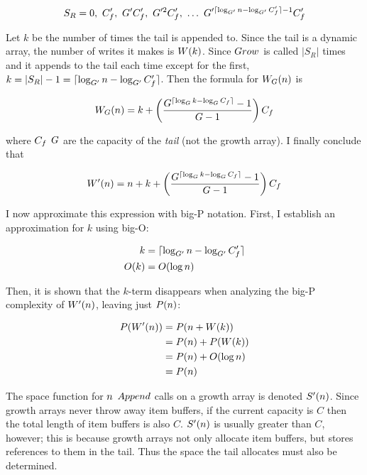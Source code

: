 $$
S_R = 0,\ \initcapacitynew,\ \growthfactornew\initcapacitynew,\ \growthfactornew^2\initcapacitynew,\ \ldots\ \growthfactornew^{\lceil \log_{\growthfactornew} \varnitems - \log_{\growthfactornew} \initcapacitynew \rceil - 1}\initcapacitynew
$$

Let $k$ be the number of times the tail is appended to. Since the tail is a dynamic array, the number of writes it makes is $W(k)$. Since $Grow$ is called $|S_R|$ times and it appends to the tail each time except for the first, $k = |S_R| - 1 = \lceil \log_{G'} n - \log_{G'} C_f' \rceil$. Then the formula for $W_G(n)$ is

$$
W_G(n) = k + \left( \frac{G^{\lceil \log_{G} k - \log_{G} C_f \rceil} - 1}{G - 1} \right) C_f
$$

where $C_f$ $G$ are the capacity of the \textit{tail} (not the growth array). I finally conclude that

$$
W'(n) = n + k + \left( \frac{G^{\lceil \log_{G} k - \log_{G} C_f \rceil} - 1}{G - 1} \right) C_f
$$

I now approximate this expression with big-P notation. First, I establish an approximation for $k$ using big-O:

\begin{align*}
k &= \lceil \log_{G'} n - \log_{G'} C_f' \rceil\\
O(k) &= O(\log n)
\end{align*}

Then, it is shown that the $k$-term disappears when analyzing the big-P complexity of $W'(n)$, leaving just $P(n)$:

\begin{align*}
P(W'(n)) &= P(n + W(k))\\
&= P(n) + P(W(k))\\
&= P(n) + O(\log n)\\
&= P(n)
\end{align*}

\scomplex

The space function for $n$ $Append$ calls on a growth array is denoted $S'(n)$. Since growth arrays never throw away item buffers, if the current capacity is $C$ then the total length of item buffers is also $C$. $S'(n)$ is usually greater than $C$, however; this is because growth arrays not only allocate item buffers, but stores references to them in the tail. Thus the space the tail allocates must also be determined.

